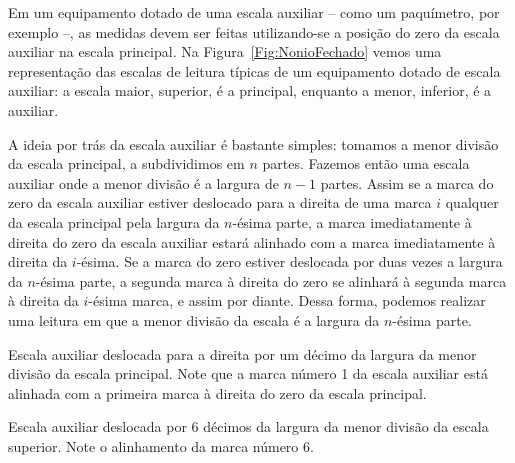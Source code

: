Em um equipamento dotado de uma escala auxiliar -- como um paquímetro, por exemplo --, as medidas devem ser feitas utilizando-se a posição do zero da escala auxiliar na escala principal. Na Figura~\eqref{Fig:NonioFechado} vemos uma representação das escalas de leitura típicas de um equipamento dotado de escala auxiliar: a escala maior, superior, é a principal, enquanto a menor, inferior, é a auxiliar.

A ideia por trás da escala auxiliar é bastante simples: tomamos a menor divisão da escala principal, a subdividimos em $n$ partes. Fazemos então uma escala auxiliar onde a menor divisão é a largura de $n-1$ partes. Assim se a marca do zero da escala auxiliar estiver deslocado para a direita de uma marca $i$ qualquer da escala principal pela largura da $n$-ésima parte, a marca imediatamente à direita do zero da escala auxiliar estará alinhado com a marca imediatamente à direita da $i$-ésima. Se a marca do zero estiver deslocada por duas vezes a largura da $n$-ésima parte, a segunda marca à direita do zero se alinhará à segunda marca à direita da $i$-ésima marca, e assim por diante. Dessa forma, podemos realizar uma leitura em que a menor divisão da escala é a largura da $n$-ésima parte.

\begin{marginfigure}
\centering
{}
\caption{Escala auxiliar deslocada para a direita por um décimo da largura da menor divisão da escala principal. Note que a marca número 1 da escala auxiliar está alinhada com a primeira marca à direita do zero da escala principal. \label{Fig:NonioAbertoUmaParte}}
\end{marginfigure}

\begin{marginfigure}
\centering
{}
\caption{Escala auxiliar deslocada por 6 décimos da largura da menor divisão da escala superior. Note o alinhamento da marca número 6.\label{Fig:NonioAbertoSeisPartes}}
\end{marginfigure}

